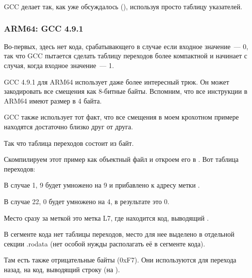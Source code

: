 GCC делает так, как уже обсуждалось (), используя просто таблицу указателей.

\subsubsection{ARM64: \Optimizing GCC 4.9.1}

Во-первых, здесь нет кода, срабатывающего в случае если входное значение~--- 0, так что GCC пытается
сделать таблицу переходов более компактной и начинает с случая, когда входное значение~--- 1.

GCC 4.9.1 для ARM64 использует даже более интересный трюк.
Он может закодировать все смещения как 8-битные байты.
Вспомним, что все инструкции в ARM64 имеют размер в 4 байта.

GCC также использует тот факт, что все смещения в моем крохотном примере находятся достаточно близко друг от друга.

Так что таблица переходов состоит из байт.



Скомпилируем этот пример как объектный файл и откроем его в \IDA. Вот таблица переходов:



В случае 1, 9 будет умножено на 9 и прибавлено к адресу метки .

В случае 22, 0 будет умножено на 4, в результате это 0.

Место сразу за меткой  это метка L7, где находится код, выводящий .

В сегменте кода нет таблицы переходов, место для нее выделено в отдельной секции .rodata
(нет особой нужды располагать её в сегменте кода).

Там есть также отрицательные байты (0xF7). Они используются для перехода назад, на код, выводящий
строку  (на ).

